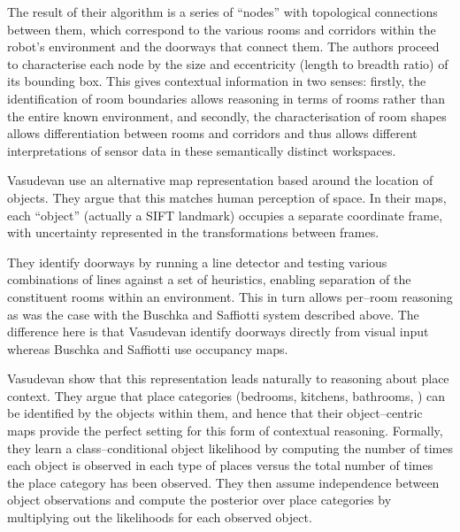 The result of their algorithm is a series of ``nodes'' with topological
connections between them, which correspond to the various rooms and
corridors within the robot's environment and the doorways that connect
them. The authors proceed to characterise each node by the size and
eccentricity (length to breadth ratio) of its bounding box. This gives
contextual information in two senses: firstly, the identification of
room boundaries allows reasoning in terms of rooms rather than the
entire known environment, and secondly, the characterisation of room
shapes allows differentiation between rooms and corridors and thus
allows different interpretations of sensor data in these semantically
distinct workspaces.

Vasudevan \etal \cite{Vasudevan07} use an alternative map representation
based around the location of objects. They argue that this matches
human perception of space. In their maps, each ``object'' (actually a
SIFT landmark) occupies a separate coordinate frame, with uncertainty
represented in the transformations between frames.

They identify doorways by running a line detector and testing various
combinations of lines against a set of heuristics, enabling separation
of the constituent rooms within an environment. This in turn allows
per--room reasoning as was the case with the Buschka and Saffiotti
system described above. The difference here is that Vasudevan \etal
identify doorways directly from visual input whereas Buschka and
Saffiotti use occupancy maps.

Vasudevan \etal show that this representation leads naturally to
reasoning about place context. They argue that place categories
(bedrooms, kitchens, bathrooms, \etc) can be identified by the objects
within them, and hence that their object--centric maps provide the
perfect setting for this form of contextual reasoning. Formally, they
learn a class--conditional object likelihood by computing the number
of times each object is observed in each type of places versus the
total number of times the place category has been observed. They then
assume independence between object observations and compute the
posterior over place categories by multiplying out the likelihoods for
each observed object. 





